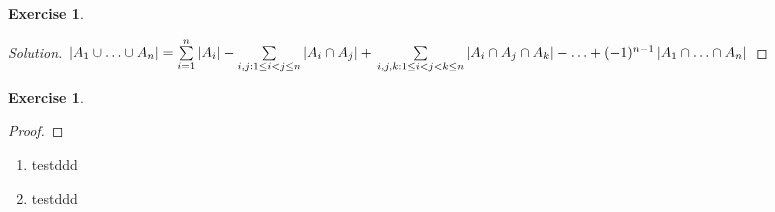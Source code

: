\documentclass[12pt,a4]{article}
\newtheorem{exercise}[theorem]{Exercise}
\newenvironment{solution}
  {\renewcommand\qedsymbol{$\blacksquare$}\begin{proof}[Solution]}
  {\end{proof}}
\begin{document}
\begin{exercise}
\end{exercise}
	\begin{solution}
$\left\vert{A_1\cup\ldots\cup A_n}\right\vert = \sum\limits_{i=1}^{n}\left\vert{A_i}\right\vert - \sum\limits_{i,j:1\le i<j\le n}\left\vert{A_i\cap A_j}\right\vert + \\
\sum\limits_{i,j,k:1\le i<j<k\le n}\left\vert{A_i\cap A_j \cap A_k}\right\vert - \ldots + (-1)^{n-1}\left\vert{A_1\cap\ldots\cap A_n}\right\vert$
	\end{solution}
\begin{exercise}
\end{exercise}
	\begin{proof}
	

	\end{proof}


\begin{enumerate}
\item testddd
\item testddd
\end{enumerate}
\end{document}

